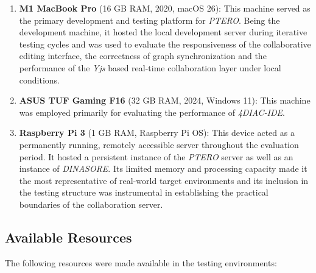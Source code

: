 \begin{enumerate}
\item \textbf{M1 MacBook Pro} (16 GB RAM, 2020, macOS 26): This machine served as the primary development and testing platform for \textit{PTERO}. Being the development machine, it hosted the local development server during iterative testing cycles and was used to evaluate the responsiveness of the collaborative editing interface, the correctness of graph synchronization and the performance of the \textit{Yjs} based real-time collaboration layer under local conditions.

\item \textbf{ASUS TUF Gaming F16} (32 GB RAM, 2024, Windows 11): This machine was employed primarily for evaluating the performance of \textit{4DIAC-IDE}.

\item \textbf{Raspberry Pi 3} (1 GB RAM, Raspberry Pi OS): This device acted as a permanently running, remotely accessible server throughout the evaluation period. It hosted a persistent instance of the \textit{PTERO} server as well as an instance of \textit{DINASORE}. Its limited memory and processing capacity made it the most representative of real-world target environments and its inclusion in the testing structure was instrumental in establishing the practical boundaries of the collaboration server.
\end{enumerate}

\subsection{Available Resources}
The following resources were made available in the testing environments:

